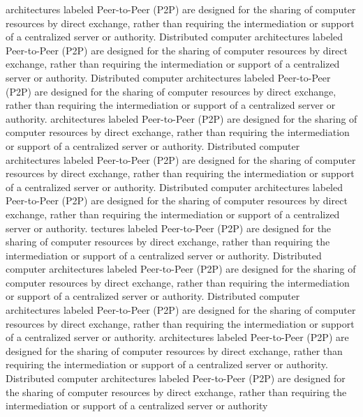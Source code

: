 architectures labeled Peer-to-Peer (P2P) \cite{li2006} are designed for the sharing of computer resources by direct exchange, rather than requiring the intermediation or support of a centralized server or authority. Distributed computer architectures labeled Peer-to-Peer (P2P) are designed for the sharing of computer resources by direct exchange, rather than requiring the intermediation or support of a centralized server or authority. Distributed computer architectures labeled Peer-to-Peer (P2P) are designed for the sharing of computer resources by direct exchange, rather than requiring the intermediation or support of a centralized server or authority. architectures labeled Peer-to-Peer (P2P) are designed for the sharing of computer resources by direct exchange, rather than requiring the intermediation or support of a centralized server or authority. Distributed computer architectures labeled Peer-to-Peer (P2P) are designed for the sharing of computer resources by direct exchange, rather than requiring the intermediation or support of a centralized server or authority. Distributed computer architectures labeled Peer-to-Peer (P2P) are designed for the sharing of computer resources by direct exchange, rather than requiring the intermediation or support of a centralized server or authority. tectures labeled Peer-to-Peer (P2P) are designed for the sharing of computer resources by direct exchange, rather than requiring the intermediation or support of a centralized server or authority. Distributed computer architectures labeled Peer-to-Peer (P2P) are designed for the sharing of computer resources by direct exchange, rather than requiring the intermediation or support of a centralized server or authority. Distributed computer architectures labeled Peer-to-Peer (P2P) are designed for the sharing of computer resources by direct exchange, rather than requiring the intermediation or support of a centralized server or authority. architectures labeled Peer-to-Peer (P2P) are designed for the sharing of computer resources by direct exchange, rather than requiring the intermediation or support of a centralized server or authority. Distributed computer architectures labeled Peer-to-Peer (P2P) are designed for the sharing of computer resources by direct exchange, rather than requiring the intermediation or support of a centralized server or authority
